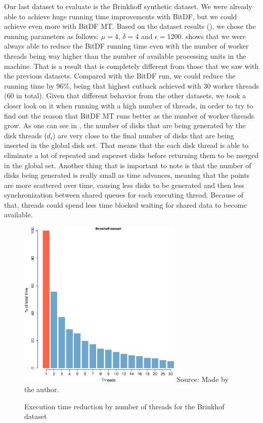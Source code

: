{Our last dataset to evaluate is the Brinkhoff synthetic dataset. We were already able to achieve huge running time
improvements with BitDF, but we could achieve even more with BitDF MT. Based on the dataset results
(), we chose the running parameters as follows: $\mu=4$, $\delta=4$ and $\epsilon=1200$.
 shows that we were always able to reduce the BitDF running time even with the number of
worker threads being way higher than the number of available processing units in the machine. That is a result that is
completely different from those that we saw with the previous datasets. Compared with the BitDF run, we could reduce the
running time by 96\%, being that highest cutback achieved with 30 worker threads (60 in total). Given that different
behavior from the other datasets, we took a closer look on it when running with a high number of threads, in order to
try to find out the reason that BitDF MT runs better as the number of worker threads grow. As one can see in
, the number of disks that are being generated by the disk threads ($d_i$) are very
close to the final number of disks that are being inserted in the global disk set. That means that the each disk thread
is able to eliminate a lot of repeated and superset disks before returning them to be merged in the global set. Another
thing that is important to note is that the number of disks being generated is really small as time advances, meaning
that the points are more scattered over time, causing less disks to be generated and then less synchronization between
shared queues for each executing thread. Because of that, threads could spend less time blocked waiting for shared data
to become available.

\begin{figure}[h!]
    \centering
    \caption{Execution time reduction by number of threads for the Brinkhof dataset}
    \includegraphics[width=0.7\textwidth]{images/Brinkhoff_thread.eps}
    \footnotesize{Source: Made by the author.}
    \label{fig:brinkhoff_threads}
\end{figure}

}
